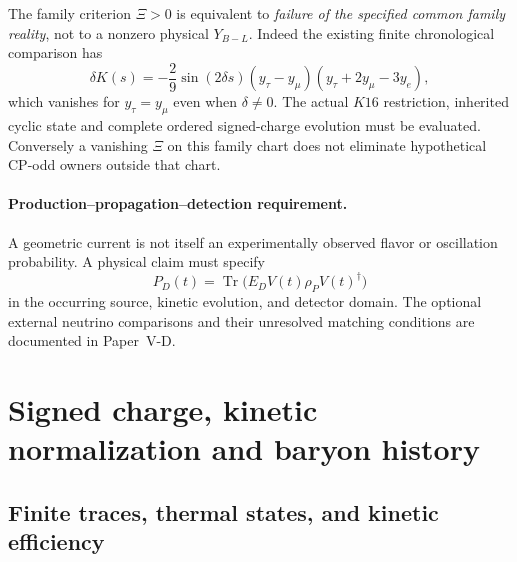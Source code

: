 \documentclass[12pt,a4paper]{article}
\begin{document}
\begin{remark}
\label{p5c:rem:v229-k16-charge-firewall}
The family criterion $\Xi>0$ is equivalent to \emph{failure of the
specified common family reality}, not to a nonzero physical
$Y_{B-L}$.  Indeed the existing finite chronological comparison has
\[
 \delta K(s)=-\frac29\sin(2\delta s)
 (y_\tau-y_\mu)(y_\tau+2y_\mu-3y_e),
\]
which vanishes for $y_\tau=y_\mu$ even when $\delta\ne0$.
The actual $K16$ restriction, inherited cyclic state and complete
ordered signed-charge evolution must be evaluated.  Conversely a
vanishing $\Xi$ on this family chart does not eliminate hypothetical
CP-odd owners outside that chart.
\end{remark}


\paragraph{Production--propagation--detection requirement.}
A geometric current is not itself an experimentally observed
flavor or oscillation probability. A physical claim must specify
\[P_D(t)=\operatorname{Tr}\bigl(E_D V(t)\rho_P V(t)^\dagger\bigr)\]
in the occurring source, kinetic evolution, and detector domain.
The optional external neutrino comparisons and their unresolved
matching conditions are documented in Paper~V-D.

\section{Signed charge, kinetic normalization and baryon history}
\label{p5c:sec:organized-baryo}
\subsection{Finite traces, thermal states, and kinetic efficiency}
\label{p7v2:sec:thermal-traces}
\end{document}
